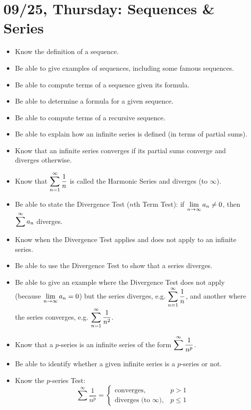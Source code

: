 \documentclass[11pt,letterpaper]{article}
\begin{document}
\newpage
\section*{09/25, Thursday: Sequences \& Series\label{09-25}}

\begin{itemize}
\item Know the definition of a sequence.
\item Be able to give examples of sequences, including some famous sequences.
\item Be able to compute terms of a sequence given its formula. 
\item Be able to determine a formula for a given sequence. 
\item Be able to compute terms of a recursive sequence. 
\item Be able to explain how an infinite series is defined (in terms of partial sums). 
\item Know that an infinite series converges if its partial sums converge and diverges otherwise.
\item Know that $\displaystyle\sum_{n=1}^\infty \dfrac{1}{n}$ is called the Harmonic Series and diverges (to $\infty$).
\item Be able to state the Divergence Test ($n$th Term Test): if $\displaystyle\lim_{n \to \infty} a_n \neq 0$, then $\displaystyle\sum^\infty a_n$ diverges. 
\item Know when the Divergence Test applies and does not apply to an infinite series. 
\item Be able to use the Divergence Test to show that a series diverges.
\item Be able to give an example where the Divergence Test does not apply (because $\displaystyle\lim_{n \to \infty} a_n= 0$) but the series diverges, e.g. $\displaystyle\sum_{n=1}^\infty \dfrac{1}{n}$, and another where the series converges, e.g. $\displaystyle\sum_{n=1}^\infty \dfrac{1}{n^2}$.
\item Know that a $p$-series is an infinite series of the form $\displaystyle\sum^\infty \dfrac{1}{n^p}$. 
\item Be able to identify whether a given infinite series is a $p$-series or not. 
\item Know the $p$-series Test:
	\[
	\sum^\infty \dfrac{1}{n^p}= \begin{cases} \text{converges}, & p > 1 \\ \text{diverges (to } \infty \text{)}, & p \leq 1 \end{cases}
	\]

\end{itemize}
\end{document}
